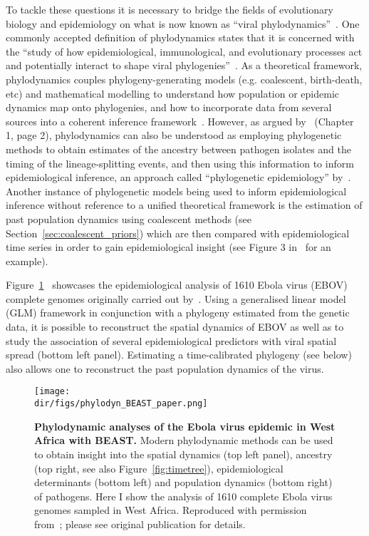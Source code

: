 To tackle these questions it is necessary to bridge the fields of evolutionary biology and epidemiology on what is now known as ``viral phylodynamics''~\citep{Grenfell2004,Volz2013,Pybus2013}.
One commonly accepted definition of phylodynamics states that it is concerned with the ``study of how epidemiological, immunological, and evolutionary processes act and potentially interact to shape viral phylogenies''~\citep{Grenfell2004}.
As a theoretical framework, phylodynamics couples phylogeny-generating models (e.g. coalescent, birth-death, etc) and mathematical modelling to understand how population or epidemic dynamics map onto phylogenies, and how to incorporate data from several sources into a coherent inference framework~\citep{Kuhnert2011}.
However, as argued by~\cite{Hall2015} (Chapter 1, page 2), phylodynamics can also be understood as employing phylogenetic methods to obtain estimates of the ancestry between pathogen isolates and the timing of the lineage-splitting events, and then using this information to inform epidemiological inference, an approach called ``phylogenetic epidemiology'' by~\cite{Kuhnert2011}.
Another instance of phylogenetic models being used to inform epidemiological inference without reference to a unified theoretical framework is the estimation of past population dynamics using coalescent methods (see Section~\ref{sec:coalescent_priors}) which are then compared with epidemiological time series in order to gain epidemiological insight (see Figure 3 in~\cite{Bennett2009} for  an example).

Figure~\ref{fig:phylodyn}~\citep{Suchard2018} showcases the epidemiological analysis of 1610 Ebola virus (EBOV) complete genomes originally carried out by~\citep{Dudas2017}.
Using a generalised linear model (GLM) framework in conjunction with a phylogeny estimated from the genetic data, it is possible to reconstruct the spatial dynamics of EBOV as well as to study the association of several epidemiological predictors with viral spatial spread (bottom left panel).
Estimating a time-calibrated phylogeny (see below) also allows one to reconstruct the past population dynamics of the virus. 

\begin{figure}[!ht]
\begin{center}
\texttt{[image: \\dir/figs/phylodyn\_BEAST\_paper.png]} 
\end{center}
 \caption[Phylodynamic analyses of the Ebola virus epidemic in West Africa with BEAST.]{\textbf{Phylodynamic analyses of the Ebola virus epidemic in West Africa with BEAST.}
 Modern phylodynamic methods can be used to obtain insight into the spatial dynamics (top left panel), ancestry (top right, see also Figure~\ref{fig:timetree}), epidemiological determinants (bottom left) and population dynamics (bottom right) of pathogens.
 Here I show the analysis of 1610 complete Ebola virus genomes sampled in West Africa.
 Reproduced with permission from~\cite{Suchard2018}; please see original publication for details.
 }
 \label{fig:phylodyn}
\end{figure}

